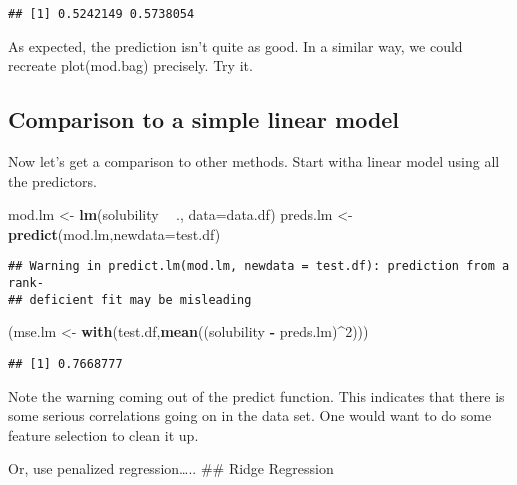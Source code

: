\documentclass[]{article}
\newenvironment{Shaded}{\begin{snugshade}}{\end{snugshade}}
\newcommand{\DataTypeTok}[1]{\textcolor[rgb]{0.13,0.29,0.53}{#1}}
\newcommand{\DecValTok}[1]{\textcolor[rgb]{0.00,0.00,0.81}{#1}}
\newcommand{\KeywordTok}[1]{\textcolor[rgb]{0.13,0.29,0.53}{\textbf{#1}}}
\newcommand{\NormalTok}[1]{#1}
\newcommand{\OperatorTok}[1]{\textcolor[rgb]{0.81,0.36,0.00}{\textbf{#1}}}
\newcommand{\StringTok}[1]{\textcolor[rgb]{0.31,0.60,0.02}{#1}}
\begin{document}
\begin{verbatim}
## [1] 0.5242149 0.5738054
\end{verbatim}

As expected, the prediction isn't quite as good. In a similar way, we
could recreate plot(mod.bag) precisely. Try it.

\hypertarget{comparison-to-a-simple-linear-model}{%
\subsection{Comparison to a simple linear
model}\label{comparison-to-a-simple-linear-model}}

Now let's get a comparison to other methods. Start witha linear model
using all the predictors.

\begin{Shaded}
\begin{Highlighting}[]
\NormalTok{mod.lm <-}\StringTok{ }\KeywordTok{lm}\NormalTok{(solubility }\OperatorTok{~}\StringTok{ }\NormalTok{.,}
             \DataTypeTok{data=}\NormalTok{data.df)}
\NormalTok{preds.lm <-}\StringTok{ }\KeywordTok{predict}\NormalTok{(mod.lm,}\DataTypeTok{newdata=}\NormalTok{test.df)}
\end{Highlighting}
\end{Shaded}

\begin{verbatim}
## Warning in predict.lm(mod.lm, newdata = test.df): prediction from a rank-
## deficient fit may be misleading
\end{verbatim}

\begin{Shaded}
\begin{Highlighting}[]
\NormalTok{(mse.lm <-}\StringTok{ }\KeywordTok{with}\NormalTok{(test.df,}\KeywordTok{mean}\NormalTok{((solubility }\OperatorTok{-}\StringTok{ }\NormalTok{preds.lm)}\OperatorTok{^}\DecValTok{2}\NormalTok{)))}
\end{Highlighting}
\end{Shaded}

\begin{verbatim}
## [1] 0.7668777
\end{verbatim}

Note the warning coming out of the predict function. This indicates that
there is some serious correlations going on in the data set. One would
want to do some feature selection to clean it up.

Or, use penalized regression\ldots{}.. \#\# Ridge Regression
\end{document}
